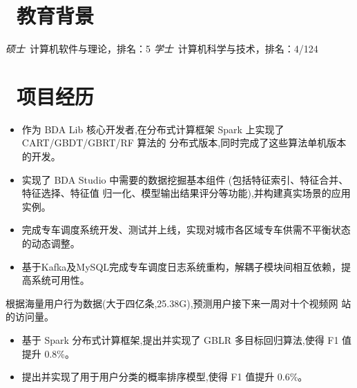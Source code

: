 \documentclass{resume}
\begin{document}


 
\section{\faGraduationCap\  教育背景}
\textit{硕士}\ 计算机软件与理论，排名：5%
\textit{学士}\ 计算机科学与技术，排名：4/124

\section{\faUsers\ 项目经历}
\begin{itemize}
  \item 作为 BDA Lib 核心开发者,在分布式计算框架 Spark 上实现了 CART/GBDT/GBRT/RF 算法的 分布式版本,同时完成了这些算法单机版本的开发。
  \item 实现了 BDA Studio 中需要的数据挖掘基本组件 (包括特征索引、特征合并、特征选择、特征值 归一化、模型输出结果评分等功能),并构建真实场景的应用实例。
\end{itemize}

\begin{onehalfspacing}
\begin{itemize}
  \item 完成专车调度系统开发、测试并上线，实现对城市各区域专车供需不平衡状态的动态调整。
  \item 基于Kafka及MySQL完成专车调度日志系统重构，解耦子模块间相互依赖，提高系统可用性。
\end{itemize}
\end{onehalfspacing}


\begin{onehalfspacing}
根据海量用户行为数据(大于四亿条,25.38G),预测用户接下来一周对十个视频网
站的访问量。
\begin{itemize}
  \item 基于 Spark 分布式计算框架,提出并实现了 GBLR 多目标回归算法,使得 F1 值提升 0.8\%。
  \item 提出并实现了用于用户分类的概率排序模型,使得 F1 值提升 0.6\%。
\end{itemize}
\end{onehalfspacing}
\end{document}
